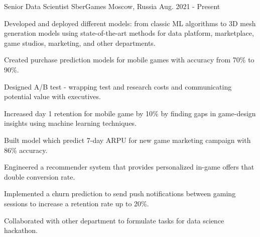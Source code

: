

\begin{cventries}

  \cventry
    {Senior Data Scientist} %
    {SberGames} %
    {Moscow, Russia} %
    {Aug. 2021 - Present} %
    {
      \begin{cvitems} %
        \item {Developed and deployed different models: from classic ML algorithms to 3D mesh generation models using state-of-the-art methods for data platform, marketplace, game studios, marketing, and other departments.}
        \item {Created purchase prediction models for mobile games with accuracy from 70\% to 90\%.}
        \item {Designed A/B test - wrapping test and research costs and communicating potential value with executives.}
        \item {Increased day 1 retention for mobile game by 10\% by finding gaps in game-design insights using machine learning techniques.}
        \item {Built model which predict 7-day ARPU for new game marketing campaign with 86\% accuracy.}
        \item {Engineered a recommender system that provides personalized in-game offers that double conversion rate.}
        \item {Implemented a churn prediction to send push notifications between gaming sessions to increase a retention rate up to 20\%.}
        \item {Collaborated with other department to formulate tasks for data science hackathon.}
      \end{cvitems}
    }


\end{cventries}

